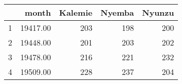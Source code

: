 \begin{table}[ht]
\centering
\begin{tabular}{rrrrr}
  \hline
 & month & Kalemie & Nyemba & Nyunzu \\ 
  \hline
1 & 19417.00 & 203 & 198 & 200 \\ 
  2 & 19448.00 & 201 & 203 & 202 \\ 
  3 & 19478.00 & 216 & 221 & 232 \\ 
  4 & 19509.00 & 228 & 237 & 204 \\ 
   \hline
\end{tabular}
\end{table}
